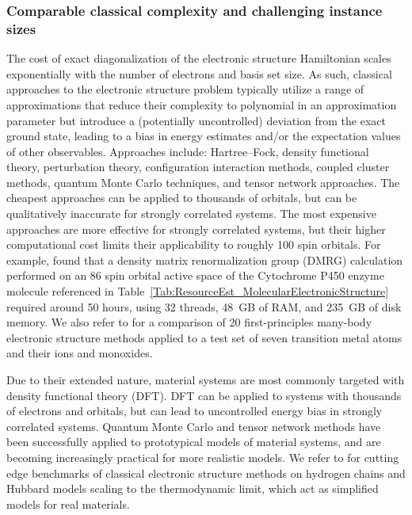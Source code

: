 \begin{refsection}
\subsubsection*{Comparable classical complexity and challenging instance sizes}
The cost of exact diagonalization of the electronic structure Hamiltonian scales exponentially with the number of electrons and basis set size. As such, classical approaches to the electronic structure problem typically utilize a range of approximations that reduce their complexity to polynomial in an approximation parameter but introduce a (potentially uncontrolled) deviation from the exact ground state, leading to a bias in energy estimates and/or the expectation values of other observables.
Approaches include: Hartree--Fock, density functional theory, perturbation theory, configuration interaction methods, coupled cluster methods, quantum Monte Carlo techniques, and tensor network approaches. The cheapest approaches can be applied to thousands of orbitals, but can be qualitatively inaccurate for strongly correlated systems. The most expensive approaches are more effective for strongly correlated systems, but their higher computational cost limits their applicability to roughly 100 spin orbitals. For example, \cite{goings2022ReliablyAssessingCytochromeEnzyme} found that a density matrix renormalization group (DMRG) calculation performed on an 86 spin orbital active space of the Cytochrome P450 enzyme molecule referenced in Table~\ref{Tab:ResourceEst_MolecularElectronicStructure} required around 50 hours, using 32 threads, 48~GB of RAM, and 235~GB of disk memory. We also refer to \cite{williams2020DirectComparisonManyBodyElectronicHamiltonians} for a comparison of 20 first-principles many-body electronic structure methods applied to a test set of seven transition metal atoms and their ions and monoxides.


Due to their extended nature, material systems are most commonly targeted with density functional theory (DFT). DFT can be applied to systems with thousands of electrons and orbitals, but can lead to uncontrolled energy bias  in strongly correlated systems. Quantum Monte Carlo and tensor network methods have been successfully applied to prototypical models of material systems, and are becoming increasingly practical for more realistic models. We refer to \cite{leblanc2015TwoDimHubbard, motta2017TowardsHydrogenChainManyBodyMethods, motta2020GroundStatePropertiesHydrogenChain, schafer2021MultiMethodHubbard} for cutting edge benchmarks of classical electronic structure methods on hydrogen chains and Hubbard models scaling to the thermodynamic limit, which act as simplified models for real materials. 





\end{refsection}
